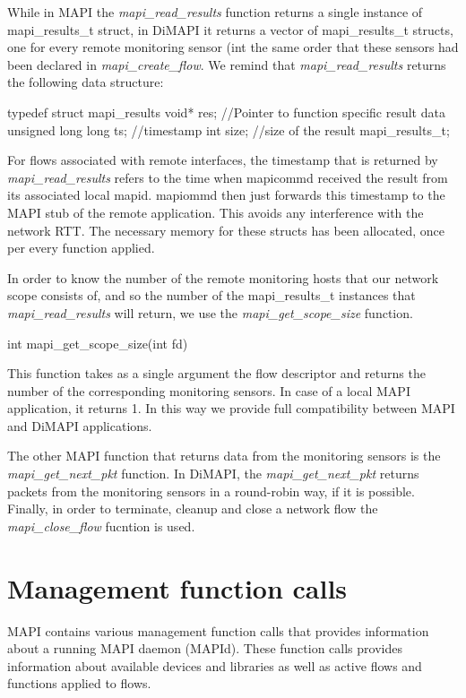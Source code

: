 \documentclass[a4paper, 11pt]{article}
\newenvironment{code}{\small\verbatim}{\endverbatim}
\begin{document}
While in MAPI the \textit{mapi\_read\_results} function returns a single instance of mapi\_results\_t struct, 
in DiMAPI it returns a vector of mapi\_results\_t structs, one for every remote monitoring sensor 
(int the same order that these sensors had been declared in \textit{mapi\_create\_flow}.
We remind that \textit{mapi\_read\_results} returns the following data structure:

\begin{code}
typedef struct mapi_results {
  void* res;			//Pointer to function specific result data
  unsigned long long ts;	//timestamp
  int size;			//size of the result
} mapi_results_t;
\end{code}

For flows  associated  with  remote  interfaces, the timestamp that is returned by 
\textit{mapi\_read\_results} refers to the time when
mapicommd received the result from its associated local mapid.  
mapiommd then just forwards this timestamp to the MAPI stub of the remote
application.  This avoids any interference with the  network  RTT.
The necessary memory for these structs has been allocated, once per every function applied.

In order to know the number of the remote monitoring hosts that our network scope 
consists of, and so the number of the mapi\_results\_t instances that \textit{mapi\_read\_results}
will return, we use the \textit{mapi\_get\_scope\_size} function.

\begin{code}
int mapi_get_scope_size(int fd)
\end{code}

This function takes as a single argument the flow descriptor and returns the number of
the corresponding monitoring sensors. In case of a local MAPI application, it returns 1.
In this way we provide full compatibility between MAPI and DiMAPI applications. 

The other MAPI function that returns data from the monitoring sensors is the 
\textit{mapi\_get\_next\_pkt} function. In DiMAPI, the \textit{mapi\_get\_next\_pkt} returns packets from
the monitoring sensors in a round-robin way, if it is possible. 
Finally, in order to terminate, cleanup and close a network flow the \textit{mapi\_close\_flow}
fucntion is used.

\section{Management function calls}
MAPI contains various management function calls that provides information about
a running MAPI daemon (MAPId). These function calls provides information about
available devices and libraries as well as active flows and functions applied to
flows.
\end{document}
